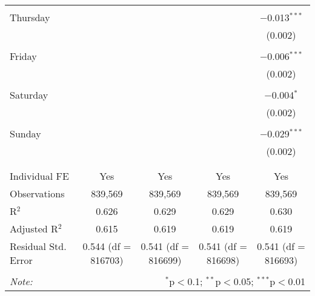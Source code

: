 \documentclass[
]{article}
\begin{document}
\begin{table}[!htbp]
{\begin{tabular}{@{\extracolsep{5pt}}lcccc}
  & & & & \\ 
 Thursday &  &  &  & $-$0.013$^{***}$ \\ 
  &  &  &  & (0.002) \\ 
  & & & & \\ 
 Friday &  &  &  & $-$0.006$^{***}$ \\ 
  &  &  &  & (0.002) \\ 
  & & & & \\ 
 Saturday &  &  &  & $-$0.004$^{*}$ \\ 
  &  &  &  & (0.002) \\ 
  & & & & \\ 
 Sunday &  &  &  & $-$0.029$^{***}$ \\ 
  &  &  &  & (0.002) \\ 
  & & & & \\ 
\hline \\[-1.8ex] 
Individual FE & Yes & Yes & Yes & Yes \\ 
Observations & 839,569 & 839,569 & 839,569 & 839,569 \\ 
R$^{2}$ & 0.626 & 0.629 & 0.629 & 0.630 \\ 
Adjusted R$^{2}$ & 0.615 & 0.619 & 0.619 & 0.619 \\ 
Residual Std. Error & 0.544 (df = 816703) & 0.541 (df = 816699) & 0.541 (df = 816698) & 0.541 (df = 816693) \\ 
\hline 
\hline \\[-1.8ex] 
\textit{Note:}  & \multicolumn{4}{r}{$^{*}$p$<$0.1; $^{**}$p$<$0.05; $^{***}$p$<$0.01} \\ 
\end{tabular}
} 
\end{table} 
\newpage
\end{document}
